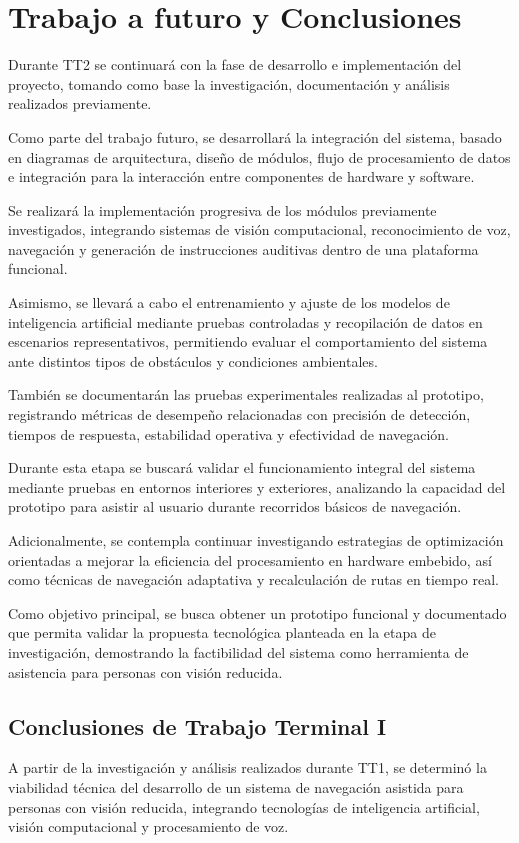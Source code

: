 \chapter{Trabajo a futuro y Conclusiones}

Durante TT2 se continuará con la fase de desarrollo e implementación del proyecto, tomando como base la investigación, documentación y análisis realizados previamente.

Como parte del trabajo futuro, se desarrollará la integración del sistema, basado en diagramas de arquitectura, diseño de módulos, flujo de procesamiento de datos e integración para la interacción entre componentes de hardware y software.

Se realizará la implementación progresiva de los módulos previamente investigados, integrando sistemas de visión computacional, reconocimiento de voz, navegación y generación de instrucciones auditivas dentro de una plataforma funcional.

Asimismo, se llevará a cabo el entrenamiento y ajuste de los modelos de inteligencia artificial mediante pruebas controladas y recopilación de datos en escenarios representativos, permitiendo evaluar el comportamiento del sistema ante distintos tipos de obstáculos y condiciones ambientales.

También se documentarán las pruebas experimentales realizadas al prototipo, registrando métricas de desempeño relacionadas con precisión de detección, tiempos de respuesta, estabilidad operativa y efectividad de navegación.

Durante esta etapa se buscará validar el funcionamiento integral del sistema mediante pruebas en entornos interiores y exteriores, analizando la capacidad del prototipo para asistir al usuario durante recorridos básicos de navegación.

Adicionalmente, se contempla continuar investigando estrategias de optimización orientadas a mejorar la eficiencia del procesamiento en hardware embebido, así como técnicas de navegación adaptativa y recalculación de rutas en tiempo real.

Como objetivo principal, se busca obtener un prototipo funcional y documentado que permita validar la propuesta tecnológica planteada en la etapa de investigación, demostrando la factibilidad del sistema como herramienta de asistencia para personas con visión reducida.

\section{Conclusiones de Trabajo Terminal I}
A partir de la investigación y análisis realizados durante TT1, se determinó la viabilidad técnica del desarrollo de un sistema de navegación asistida para personas con visión reducida, integrando tecnologías de inteligencia artificial, visión computacional y procesamiento de voz.

